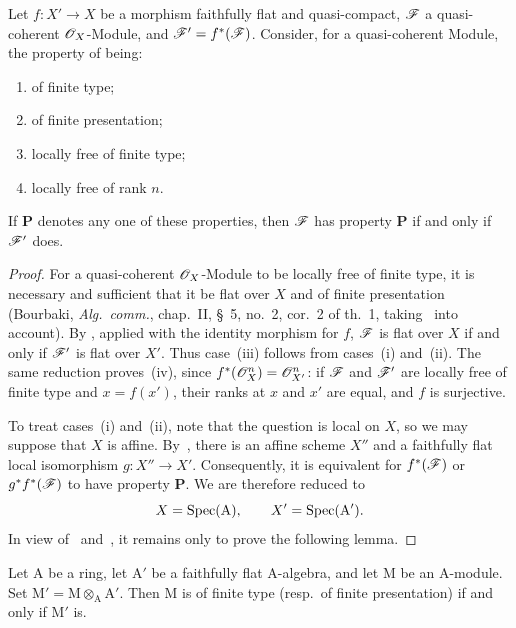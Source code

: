 \begin{proposition}[2.5.2]
\label{IV.2.5.2}
Let $f:X'\to X$ be a morphism faithfully flat and quasi-compact,
$\mathscr{F}$ a quasi-coherent $\mathscr{O}_X$-Module, and
$\mathscr{F}'=f^*(\mathscr{F})$. Consider, for a quasi-coherent Module, the property
of being:
\begin{enumerate}
  \item[(i)] of finite type;
  \item[(ii)] of finite presentation;
  \item[(iii)] locally free of finite type;
  \item[(iv)] locally free of rank $n$.
\end{enumerate}
If $\mathbf{P}$ denotes any one of these properties, then $\mathscr{F}$ has
property $\mathbf{P}$ if and only if $\mathscr{F}'$ does.
\end{proposition}

\begin{proof}
For a quasi-coherent $\mathscr{O}_X$-Module to be locally free of finite type,
it is necessary and sufficient that it be flat over $X$ and of finite
presentation (Bourbaki, \emph{Alg.\ comm.}, chap.~II, \S~5, no.~2,
cor.~2 of th.~1, taking~ into account). By
, applied with the identity morphism for $f$, $\mathscr{F}$ is
flat over $X$ if and only if $\mathscr{F}'$ is flat over $X'$. Thus case~(iii)
follows from cases~(i) and~(ii). The same reduction proves~(iv), since
$f^*(\mathscr{O}_X^n)=\mathscr{O}_{X'}^n$: if $\mathscr{F}$ and $\mathscr{F}'$ are locally
free of finite type and $x=f(x')$, their ranks at $x$ and $x'$ are equal,
and $f$ is surjective.


To treat cases~(i) and~(ii), note that the question is local on $X$, so we
may suppose that $X$ is affine. By~, there is an affine
scheme $X''$ and a faithfully flat local isomorphism $g:X''\to X'$.
Consequently, it is equivalent for $f^*(\mathscr{F})$ or
$g^*f^*(\mathscr{F})$ to have property $\mathbf{P}$. We are therefore reduced
to
\[
  X=\operatorname{Spec}(\mathrm{A}),\qquad X'=\operatorname{Spec}(\mathrm{A}').
\]
In view of~ and~, it remains only to
prove the following lemma.
\end{proof}

\begin{lemma}[2.5.3]
\label{IV.2.5.3}
Let $\mathrm{A}$ be a ring, let $\mathrm{A}'$ be a faithfully flat
$\mathrm{A}$-algebra, and let $\mathrm{M}$ be an $\mathrm{A}$-module.
Set $\mathrm{M}'=\mathrm{M}\otimes_{\mathrm{A}}\mathrm{A}'$. Then
$\mathrm{M}$ is of finite type \textnormal{(}resp.\ of finite
presentation\textnormal{)} if and only if $\mathrm{M}'$ is.
\end{lemma}

